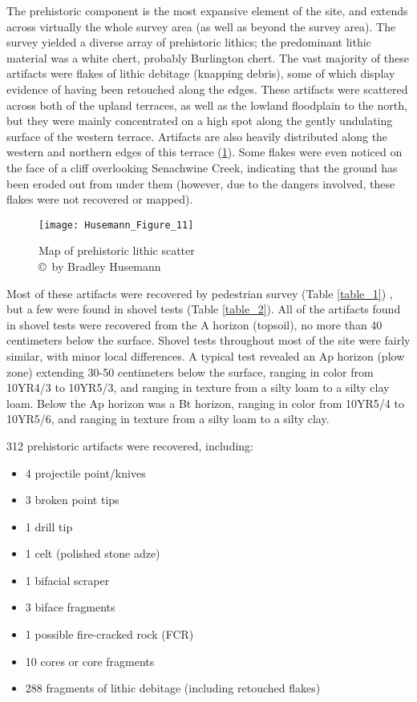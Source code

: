

The prehistoric component is the most expansive element of the site, and extends across virtually the whole survey area (as well as beyond the survey area). The survey yielded a diverse array of prehistoric lithics; the predominant lithic material was a white chert, probably Burlington chert. The vast majority of these artifacts were flakes of lithic debitage (knapping debris), some of which display evidence of having been retouched along the edges. These artifacts were scattered across both of the upland terraces, as well as the lowland floodplain to the north, but they were mainly concentrated on a high spot along the gently undulating surface of the western terrace. Artifacts are also heavily distributed along the western and northern edges of this terrace (\cref{fig:Husemann_Figure_11}). Some flakes were even noticed on the face of a cliff overlooking Senachwine Creek, indicating that the ground has been eroded out from under them (however, due to the dangers involved, these flakes were not recovered or mapped).

\begin{figure}[!p]
	\texttt{[image: Husemann\_Figure\_11]}
	\caption{Map of prehistoric lithic scatter
		{\normalfont\scriptsize \\ \copyright\ by Bradley Husemann
	}}
	\label{fig:Husemann_Figure_11}
\end{figure}

Most of these artifacts were recovered by pedestrian survey (Table \ref{table_1})
, but a few were found in shovel tests (Table \ref{table_2}). All of the artifacts found in shovel tests were recovered from the A horizon (topsoil), no more than 40 centimeters below the surface. Shovel tests throughout most of the site were fairly similar, with minor local differences.  A typical test revealed an Ap horizon (plow zone) extending 30-50 centimeters below the surface, ranging in color from 10YR4/3 to 10YR5/3, and ranging in texture from a silty loam to a silty clay loam.  Below the Ap horizon was a Bt horizon, ranging in color from 10YR5/4 to 10YR5/6, and ranging in texture from a silty loam to a silty clay.

312 prehistoric artifacts were recovered, including:

\begin{itemize}
	\item 4 projectile point/knives
	\item 3 broken point tips
	\item 1 drill tip
	\item 1 celt (polished stone adze)
	\item 1 bifacial scraper
	\item 3 biface fragments
	\item 1 possible fire-cracked rock (FCR)
	\item 10 cores or core fragments
	\item 288 fragments of lithic debitage (including retouched flakes)
\end{itemize}

